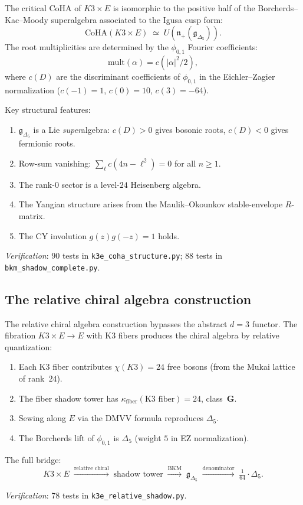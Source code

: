 \documentclass[11pt]{article}
\newcommand{\fg}{\mathfrak{g}}
\newcommand{\fn}{\mathfrak{n}}
\newcommand{\CoHA}{\mathrm{CoHA}}
\newcommand{\mult}{\mathrm{mult}}
\begin{document}
\begin{theorem}
\label{wn:thm:k3e-coha}
The critical CoHA of $K3 \times E$ is isomorphic to the positive half of the Borcherds--Kac--Moody superalgebra associated to the Igusa cusp form:
\[
 \CoHA(K3 \times E) \;\simeq\; U(\fn_+(\fg_{\Delta_5})).
\]
The root multiplicities are determined by the $\phi_{0,1}$ Fourier coefficients:
\[
 \mult(\alpha) = c(|\alpha|^2/2),
\]
where $c(D)$ are the discriminant coefficients of $\phi_{0,1}$ in the Eichler--Zagier normalization ($c(-1) = 1$, $c(0) = 10$, $c(3) = -64$).

Key structural features:
\begin{enumerate}[label=\textup{(\roman*)}]
 \item $\fg_{\Delta_5}$ is a Lie \emph{super}algebra: $c(D) > 0$ gives bosonic roots, $c(D) < 0$ gives fermionic roots.
 \item Row-sum vanishing: $\sum_{\ell} c(4n - \ell^2) = 0$ for all $n \geq 1$.
 \item The rank-$0$ sector is a level-$24$ Heisenberg algebra.
 \item The Yangian structure arises from the Maulik--Okounkov stable-envelope $R$-matrix.
 \item The CY involution $g(z)g(-z) = 1$ holds.
\end{enumerate}

\noindent\textit{Verification}: 90 tests in \texttt{k3e\_coha\_structure.py}; 88 tests in \texttt{bkm\_shadow\_complete.py}.
\end{theorem}

\subsection{The relative chiral algebra construction}
\label{subsec:k3e-relative}

\begin{proposition}
\label{prop:k3e-relative-chiral}
The relative chiral algebra construction bypasses the abstract $d = 3$ functor. The fibration $K3 \times E \to E$ with K3 fibers produces the chiral algebra by relative quantization:
\begin{enumerate}[label=\textup{(\roman*)}]
 \item Each K3 fiber contributes $\chi(K3) = 24$ free bosons (from the Mukai lattice of rank~$24$).
 \item The fiber shadow tower has $\kappa_{\mathrm{fiber}}(\text{K3 fiber}) = 24$, class~$\mathbf{G}$.
 \item Sewing along $E$ via the DMVV formula reproduces $\Delta_5$.
 \item The Borcherds lift of $\phi_{0,1}$ is $\Delta_5$ (weight $5$ in EZ normalization).
\end{enumerate}

The full bridge:
\[
 K3 \times E \;\xrightarrow{\text{relative chiral}}\; \text{shadow tower}
 \;\xrightarrow{\text{BKM}}\; \fg_{\Delta_5}
 \;\xrightarrow{\text{denominator}}\; \tfrac{1}{64} \cdot \Delta_5.
\]

\noindent\textit{Verification}: 78 tests in \texttt{k3e\_relative\_shadow.py}.
\end{proposition}
\end{document}
